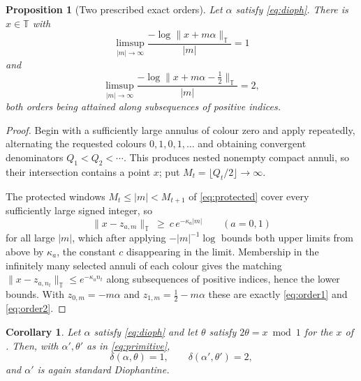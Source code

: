 \documentclass[11pt,reqno]{amsart}
\theoremstyle{plain}
\newtheorem{proposition}[theorem]{Proposition}
\newtheorem{corollary}[theorem]{Corollary}
\theoremstyle{definition}
\theoremstyle{remark}
\numberwithin{equation}{section}
\begin{document}
\begin{proposition}[Two prescribed exact orders]
  \label{prop:two-orders}
  Let $\alpha$ satisfy \eqref{eq:dioph}. There is $x\in\mathbb T$ with
  \begin{equation}
    \label{eq:order1}
    \limsup_{|m|\to\infty}
      \frac{-\log\lVert x+m\alpha\rVert_{\mathbb T}}{|m|}=1
  \end{equation}
  and
  \begin{equation}
    \label{eq:order2}
    \limsup_{|m|\to\infty}
      \frac{-\log\lVert x+m\alpha-\tfrac12\rVert_{\mathbb T}}{|m|}=2,
  \end{equation}
  both orders being attained along subsequences of positive indices.
\end{proposition}

\begin{proof}
  Begin with a sufficiently large annulus of colour zero and apply
   repeatedly, alternating the requested colours
  $0,1,0,1,\dots$ and obtaining convergent denominators $Q_1<Q_2<\cdots$.
  This produces nested nonempty compact annuli, so their intersection
  contains a point $x$; put $M_t=\lfloor Q_t/2\rfloor\to\infty$.

  The protected windows $M_t\le|m|<M_{t+1}$ of \eqref{eq:protected} cover
  every sufficiently large signed integer, so
  \begin{equation}
    \label{eq:lower}
    \lVert x-z_{a,m}\rVert_{\mathbb T}\ \ge\ c\,e^{-\kappa_a|m|}
    \qquad(a=0,1)
  \end{equation}
  for all large $|m|$, which after applying $-|m|^{-1}\log$ bounds both
  upper limits from above by $\kappa_a$, the constant $c$ disappearing in
  the limit. Membership in the infinitely many selected annuli of each
  colour gives the matching
  $\lVert x-z_{a,n_t}\rVert_{\mathbb T}\le e^{-\kappa_a n_t}$ along
  subsequences of positive indices, hence the lower bounds. With
  $z_{0,m}=-m\alpha$ and $z_{1,m}=\tfrac12-m\alpha$ these are exactly
  \eqref{eq:order1} and \eqref{eq:order2}.
\end{proof}

\begin{corollary}
  \label{cor:exponents}
  Let $\alpha$ satisfy \eqref{eq:dioph} and let $\theta$ satisfy
  $2\theta=x\bmod1$ for the $x$ of . Then, with
  $\alpha',\theta'$ as in \eqref{eq:primitive},
  \begin{equation}
    \label{eq:two-deltas}
    \delta(\alpha,\theta)=1,
    \qquad
    \delta(\alpha',\theta')=2,
  \end{equation}
  and $\alpha'$ is again standard Diophantine.
\end{corollary}
\end{document}

